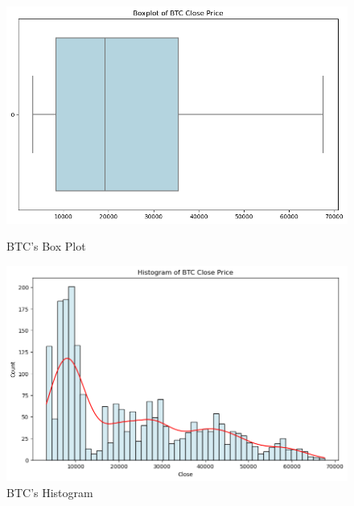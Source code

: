 \documentclass{ieeeojies}
\begin{document}
\begin{figure}[H]
    \centering
    \begin{minipage}{0.23\textwidth}
        \centering
        \includegraphics[width=\linewidth]{graph/btc_boxplot.png}
        \caption{BTC's Box Plot}
        \label{fig:3}
    \end{minipage}
    \hfill
    \begin{minipage}{0.23\textwidth}
        \centering
        \includegraphics[width=\linewidth]{graph/btc_his.png}
        \caption{BTC's Histogram}
        \label{fig:4}
    \end{minipage}
\end{figure}
\end{document}
